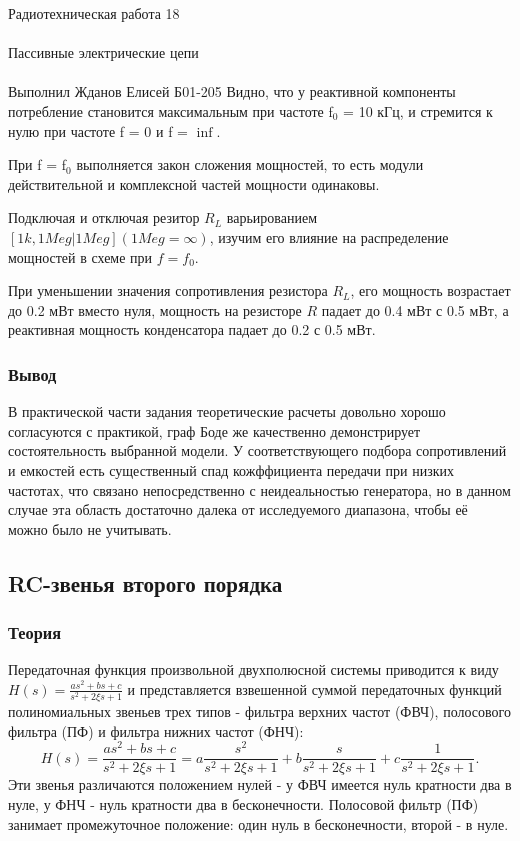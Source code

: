 \documentclass{astroedu-lab}
\begin{document}
\begin{problem}{\huge Радиотехническая работа 18\\\\Пассивные электрические цепи\\\\Выполнил Жданов Елисей Б01-205}
Видно, что у реактивной компоненты потребление становится максимальным при частоте f$_0$ = 10 кГц, и стремится к нулю при частоте f = 0 и f = $\inf$.

При f = f$_0$
выполняется закон сложения мощностей, то есть модули действительной и комплексной частей мощности одинаковы.

Подключая и отключая резитор $R_L$ варьированием $[1k, 1Meg \vert 1Meg] (1Meg = \infty)$, изучим его влияние на распределение мощностей в схеме при $f = f_0$.

При уменьшении значения сопротивления резистора $R_L$, его мощность возрастает до 0.2 мВт вместо нуля, мощность на резисторе $R$ падает до 0.4 мВт с 0.5 мВт, а реактивная мощность конденсатора падает до 0.2 с 0.5 мВт.


\subsubsection{Вывод}

В практической части задания теоретические расчеты довольно хорошо согласуются с практикой, граф Боде же качественно демонстрирует состоятельность выбранной модели. У соответствующего подбора сопротивлений и емкостей есть существенный спад кожффициента передачи при низких частотах, что связано непосредственно с неидеальностью генератора, но в данном случае эта область достаточно далека от исследуемого диапазона, чтобы её можно было не учитывать.

\subsection{RC-звенья второго порядка}

\subsubsection{Теория}

Передаточная функция произвольной двухполюсной системы приводится к виду $H(s)=\frac{a s^2+b s+c}{s^2+2 \xi s+1}$ и представляется взвешенной суммой передаточных функций полиномиальных звеньев трех типов - фильтра верхних частот (ФВЧ), полосового фильтра (ПФ) и фильтра нижних частот (ФНЧ):
$$
H(s)=\frac{a s^2+b s+c}{s^2+2 \xi s+1}=a \frac{s^2}{s^2+2 \xi s+1}+b \frac{s}{s^2+2 \xi s+1}+c \frac{1}{s^2+2 \xi s+1} .
$$
Эти звенья различаются положением нулей - у ФВЧ имеется нуль кратности два в нуле, у ФНЧ - нуль кратности два в бесконечности. Полосовой фильтр (ПФ) занимает промежуточное положение: один нуль в бесконечности, второй - в нуле.


\end{problem}
\end{document}
